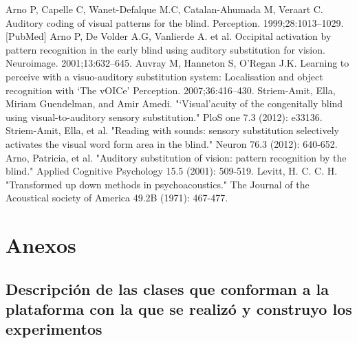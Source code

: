 \documentclass{article}
\begin{document}
\begin{thebibliography}{9}
Arno P, Capelle C, Wanet-Defalque M.C, Catalan-Ahumada M, Veraart C. Auditory coding of visual patterns for the blind. Perception. 1999;28:1013–1029. [PubMed]
Arno P, De Volder A.G, Vanlierde A. et al. Occipital activation by pattern recognition in the early blind using auditory substitution for vision. Neuroimage. 2001;13:632–645.
Auvray M, Hanneton S, O’Regan J.K. Learning to perceive with a visuo-auditory substitution system: Localisation and object recognition with ‘The vOICe’ Perception. 2007;36:416–430.
Striem-Amit, Ella, Miriam Guendelman, and Amir Amedi. "‘Visual’acuity of the congenitally blind using visual-to-auditory sensory substitution." PloS one 7.3 (2012): e33136.
Striem-Amit, Ella, et al. "Reading with sounds: sensory substitution selectively activates the visual word form area in the blind." Neuron 76.3 (2012): 640-652.
Arno, Patricia, et al. "Auditory substitution of vision: pattern recognition by the blind." Applied Cognitive Psychology 15.5 (2001): 509-519.
Levitt, H. C. C. H. "Transformed up down methods in psychoacoustics." The Journal of the Acoustical society of America 49.2B (1971): 467-477.
\end{thebibliography}


\clearpage

\section{Anexos}
\subsection{Descripción de las clases que conforman a la plataforma con la que se realizó y construyo los experimentos} \label{anexo:Clases}
\end{document}
